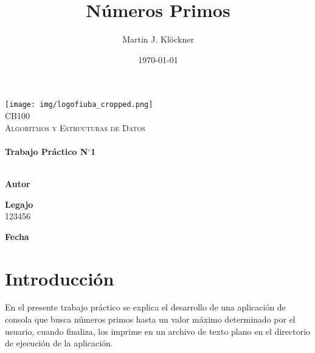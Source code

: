 \documentclass[12pt]{article}
\title{Números Primos}          %
\author{Martin J. Klöckner}     %
\date{\today}                   %
\makeatletter
\newcommand{\padron}{123456}    %
\newcommand{\tpnumber}{1}       %
\let\thetitle\@title
\let\theauthor\@author
\let\thedate\@date
\makeatother
\begin{document}
\begin{titlepage}
    \vspace*{-2.5cm}
    {\centering
    \texttt{[image: img/logofiuba\_cropped.png]}\\[2.5 cm]}
    \centering
    \textsc{\Large CB100}\\[0.2 cm]
    \textsc{\large Algoritmos y Estructuras de Datos}\\[4 cm]
    \textcolor{cyan}{{\fontsize{40}{60}\selectfont \bfseries \thetitle}}\\[0.5cm]
    {\Large \bfseries Trabajo Práctico N$^\circ$\tpnumber}\\[5cm]


    \vfill
    \noindent\makebox[\linewidth]{\rule{\textwidth}{0.4pt}}\\[0.5cm]
    \begin{minipage}{.46\textwidth}
    \textbf{Autor}\\
    \theauthor
    \end{minipage}%
    \begin{minipage}{.34\textwidth}
    \textbf{Legajo}\\
    \padron
    \end{minipage}%
    \begin{minipage}{.2\textwidth}
     \begin{flushright}
        \textbf{Fecha}\\
        \thedate
    \end{flushright}
    \end{minipage}
\end{titlepage}


{
    \hypersetup{linkcolor=black} %
    \tableofcontents
    \thispagestyle{empty}
    \pagebreak
    \setcounter{page}{1}
}


\section{Introducción}

En el presente trabajo práctico se explica el desarrollo de una aplicación de
consola que busca números primos hasta un valor máximo determinado por el
usuario, cuando finaliza, los imprime en un archivo de texto plano en el
directorio de ejecución de la aplicación.
\end{document}
